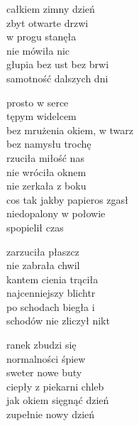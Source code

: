 \begin{text}
całkiem zimny dzień\\
zbyt otwarte drzwi\\
w progu stanęła\\
nie mówiła nic\\
głupia bez ust bez brwi\\
samotność dalszych dni

\vin prosto w serce\\
\vin tępym widelcem\\
\vin bez mrużenia okiem, w twarz\\
\vin bez namysłu trochę\\
\vin rzuciła miłość nas\\
\vin nie wróciła oknem\\
\vin nie zerkała z boku\\
\vin cos tak jakby papieros zgasł\\
\vin niedopalony w połowie\\
\vin spopielił czas

zarzuciła płaszcz\\
nie zabrała chwil\\
kantem cienia trąciła\\
najcenniejszy blichtr\\
po schodach biegła i\\
schodów nie zliczył nikt

ranek zbudzi się\\
normalności śpiew\\
sweter nowe buty\\
ciepły z piekarni chleb\\
jak okiem sięgnąć dzień\\
zupełnie nowy dzień
\end{text}